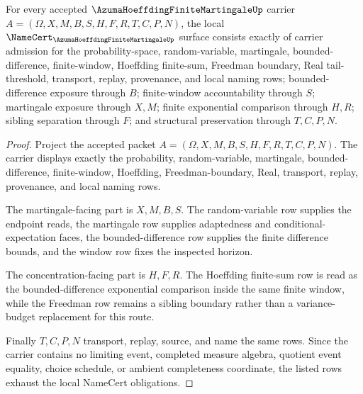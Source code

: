 \begin{theorem}
\label{thm:azuma-hoeffding-finite-martingale-namecert-obligations}
For every accepted $\AzumaHoeffdingFiniteMartingaleUp$ carrier $A=(\Omega,X,M,B,S,H,F,R,T,C,P,N)$, the local $\NameCert_{\AzumaHoeffdingFiniteMartingaleUp}$ surface consists exactly of carrier admission for the probability-space, random-variable, martingale, bounded-difference, finite-window, Hoeffding finite-sum, Freedman boundary, Real tail-threshold, transport, replay, provenance, and local naming rows; bounded-difference exposure through $B$; finite-window accountability through $S$; martingale exposure through $X,M$; finite exponential comparison through $H,R$; sibling separation through $F$; and structural preservation through $T,C,P,N$.
\end{theorem}
\begin{proof}
Project the accepted packet $A=(\Omega,X,M,B,S,H,F,R,T,C,P,N)$. The carrier displays exactly the probability, random-variable, martingale, bounded-difference, finite-window, Hoeffding, Freedman-boundary, Real, transport, replay, provenance, and local naming rows.

The martingale-facing part is $X,M,B,S$. The random-variable row supplies the endpoint reads, the martingale row supplies adaptedness and conditional-expectation faces, the bounded-difference row supplies the finite difference bounds, and the window row fixes the inspected horizon.

The concentration-facing part is $H,F,R$. The Hoeffding finite-sum row is read as the bounded-difference exponential comparison inside the same finite window, while the Freedman row remains a sibling boundary rather than a variance-budget replacement for this route.

Finally $T,C,P,N$ transport, replay, source, and name the same rows. Since the carrier contains no limiting event, completed measure algebra, quotient event equality, choice schedule, or ambient completeness coordinate, the listed rows exhaust the local NameCert obligations.
\end{proof}


